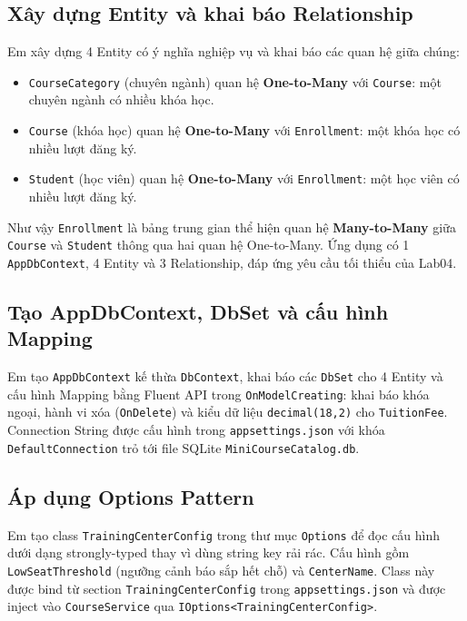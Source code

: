 \subsection{Xây dựng Entity và khai báo Relationship}

Em xây dựng 4 Entity có ý nghĩa nghiệp vụ và khai báo các quan hệ giữa chúng:

\begin{itemize}[leftmargin = 0.6cm, label = -]
    \item \texttt{CourseCategory} (chuyên ngành) quan hệ \textbf{One-to-Many} với \texttt{Course}: một chuyên ngành có nhiều khóa học.
    \item \texttt{Course} (khóa học) quan hệ \textbf{One-to-Many} với \texttt{Enrollment}: một khóa học có nhiều lượt đăng ký.
    \item \texttt{Student} (học viên) quan hệ \textbf{One-to-Many} với \texttt{Enrollment}: một học viên có nhiều lượt đăng ký.
\end{itemize}

Như vậy \texttt{Enrollment} là bảng trung gian thể hiện quan hệ \textbf{Many-to-Many} giữa \texttt{Course} và \texttt{Student} thông qua hai quan hệ One-to-Many. Ứng dụng có 1 \texttt{AppDbContext}, 4 Entity và 3 Relationship, đáp ứng yêu cầu tối thiểu của Lab04.

\subsection{Tạo AppDbContext, DbSet và cấu hình Mapping}

Em tạo \texttt{AppDbContext} kế thừa \texttt{DbContext}, khai báo các \texttt{DbSet} cho 4 Entity và cấu hình Mapping bằng Fluent API trong \texttt{OnModelCreating}: khai báo khóa ngoại, hành vi xóa (\texttt{OnDelete}) và kiểu dữ liệu \texttt{decimal(18,2)} cho \texttt{TuitionFee}. Connection String được cấu hình trong \texttt{appsettings.json} với khóa \texttt{DefaultConnection} trỏ tới file SQLite \texttt{MiniCourseCatalog.db}.

\subsection{Áp dụng Options Pattern}

Em tạo class \texttt{TrainingCenterConfig} trong thư mục \texttt{Options} để đọc cấu hình dưới dạng strongly-typed thay vì dùng string key rải rác. Cấu hình gồm \texttt{LowSeatThreshold} (ngưỡng cảnh báo sắp hết chỗ) và \texttt{CenterName}. Class này được bind từ section \texttt{TrainingCenterConfig} trong \texttt{appsettings.json} và được inject vào \texttt{CourseService} qua \texttt{IOptions<TrainingCenterConfig>}.

